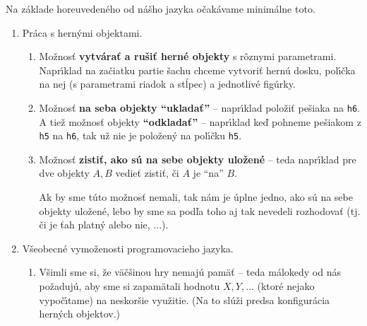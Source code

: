 \documentclass[a4paper,12pt]{article}
\begin{document}
Na z\'{a}klade horeuveden\'{e}ho od n\'{a}\v{s}ho jazyka o\v{c}ak\'{a}vame
minim\'{a}lne toto.

\begin{enumerate}
    \item Pr\'{a}ca s hern\'{y}mi objektami.
    \begin{enumerate}
        \item Mo\v{z}nos\v{t} \textbf{vytv\'{a}ra\v{t} a ru\v{s}i\v{t} hern\'{e}
        objekty} s r\^{o}znymi parametrami. Napr\'{\i}klad na za\v{c}iatku
        partie \v{s}achu chceme vytvori\v{t} hern\'{u} dosku, pol\'{\i}\v{c}ka
        na nej (s parametrami riadok a st\'{l}pec) a jednotliv\'{e} fig\'{u}rky.
        \item Mo\v{z}nos\v{t} \textbf{na seba objekty ``uklada\v{t}''} -- napr\'{\i}klad
        polo\v{z}i\v{t} pe\v{s}iaka na \verb|h6|. A tie\v{z} mo\v{z}nos\v{t}
        objekty \textbf{``odklada\v{t}''} -- napr\'{\i}klad ke\v{d} pohneme pe\v{s}iakom
        z \verb|h5| na \verb|h6|, tak u\v{z} nie je polo\v{z}en\'{y} na
        pol\'{\i}\v{c}ku \verb|h5|.
        \item Mo\v{z}nos\v{t} \textbf{zisti\v{t}, ako s\'{u} na sebe objekty
        ulo\v{z}en\'{e}} -- teda napr\'{\i}klad pre dve objekty $A, B$
        vedie\v{t} zisti\v{t}, \v{c}i $A$ je ``na'' $B$.
        
        Ak by sme t\'{u}to mo\v{z}nos\v{t} nemali, tak n\'{a}m je \'{u}plne
        jedno, ako s\'{u} na sebe objekty ulo\v{z}en\'{e}, lebo by sme sa
        pod\v{l}a toho aj tak nevedeli rozhodova\v{t} (tj. \v{c}i je
        \v{t}ah platn\'{y} alebo nie, ...).
    \end{enumerate}
    \item V\v{s}eobecn\'{e} vymo\v{z}enosti programovacieho jazyka.
    \begin{enumerate}
        \item V\v{s}imli sme si, \v{z}e v\"{a}\v{c}\v{s}inou hry nemaj\'{u}
        pam\"{a}\v{t} -- teda m\'{a}lokedy od n\'{a}s po\v{z}aduj\'{u},
        aby sme si zapam\"{a}tali hodnotu $X, Y, \ldots$ (ktor\'{e}
        nejako vypo\v{c}\'{\i}tame) na neskor\v{s}ie vyu\v{z}itie.
        (Na to sl\'{u}\v{z}i predsa konfigur\'{a}cia hern\'{y}ch objektov.)
        

\end{enumerate}
\end{enumerate}
\end{document}

